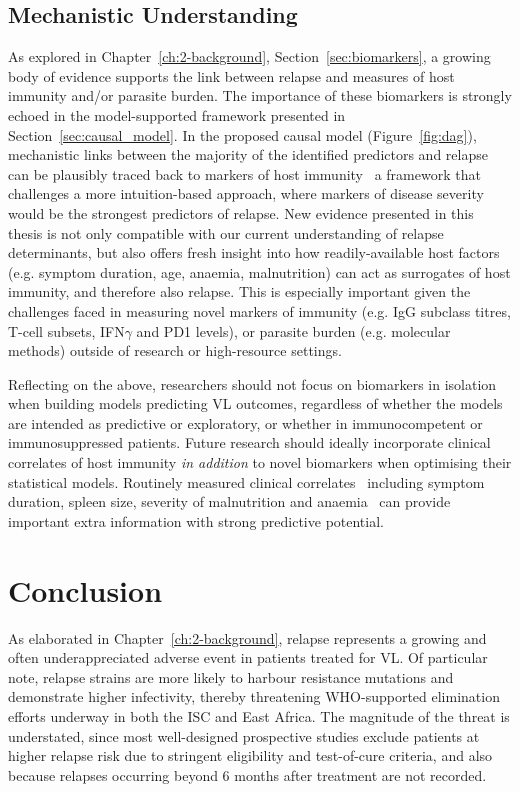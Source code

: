 \subsection{Mechanistic Understanding}

As explored in Chapter~\ref{ch:2-background}, Section~\ref{sec:biomarkers}, a growing body of evidence supports the link between relapse and measures of host immunity and/or parasite burden. The importance of these biomarkers is strongly echoed in the model-supported framework presented in Section~\ref{sec:causal_model}. In the proposed causal model (Figure~\ref{fig:dag}), mechanistic links between the majority of the identified predictors and relapse can be plausibly traced back to markers of host immunity \textemdash\ a framework that challenges a more intuition-based approach, where markers of disease severity would be the strongest predictors of relapse. New evidence presented in this thesis is not only compatible with our current understanding of relapse determinants, but also offers fresh insight into how readily-available host factors (e.g. symptom duration, age, anaemia, malnutrition) can act as surrogates of host immunity, and therefore also relapse. This is especially important given the challenges faced in measuring novel markers of immunity (e.g. IgG subclass titres, T-cell subsets, IFN$\gamma$ and PD1 levels), or parasite burden (e.g. molecular methods) outside of research or high-resource settings.

Reflecting on the above, researchers should not focus on biomarkers in isolation when building models predicting VL outcomes, regardless of whether the models are intended as predictive or exploratory, or whether in immunocompetent or immunosuppressed patients. Future research should ideally incorporate clinical correlates of host immunity \textit{in addition} to novel biomarkers when optimising their statistical models. Routinely measured clinical correlates \textemdash\ including symptom duration, spleen size, severity of malnutrition and anaemia \textemdash\ can provide important extra information with strong predictive potential.

\section{Conclusion}

As elaborated in Chapter~\ref{ch:2-background}, relapse represents a growing and often underappreciated adverse event in patients treated for VL. Of particular note, relapse strains are more likely to harbour resistance mutations and demonstrate higher infectivity, thereby threatening WHO-supported elimination efforts underway in both the ISC and East Africa. The magnitude of the threat is understated, since most well-designed prospective studies exclude patients at higher relapse risk due to stringent eligibility and test-of-cure criteria, and also because relapses occurring beyond 6 months after treatment are not recorded.

